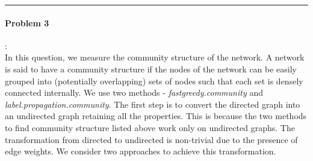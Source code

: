 \documentclass{article}
\begin{document}
\hrule

\paragraph{Problem 3}:\\
In this question, we measure the community structure of the network. 
A network is said to have a community structure if the nodes of the network 
can be easily grouped into (potentially overlapping) sets of nodes such that each set is densely connected internally. 
We use two methods - \textit{fastgreedy.community} and \textit{label.propagation.community}.
The first step is to convert the directed graph into an undirected graph retaining all the properties. This is because
the two methods to find community structure listed above work only on undirected graphs. The transformation from
directed to undirected is non-trivial due to the presence of edge weights. We consider two approaches to achieve this transformation.
\end{document}
